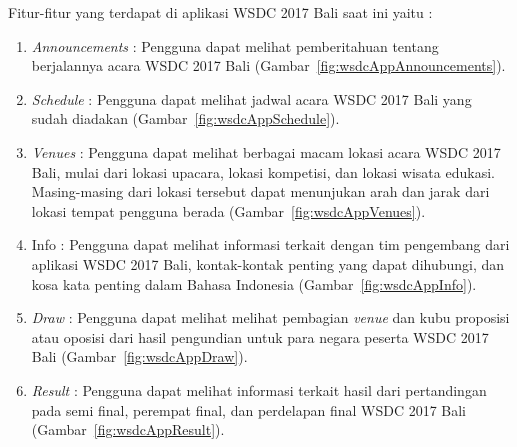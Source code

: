 Fitur-fitur yang terdapat di aplikasi WSDC 2017 Bali saat ini yaitu :

\begin{enumerate}
	\item {\it Announcements} : Pengguna dapat melihat pemberitahuan tentang berjalannya acara WSDC 2017 Bali (Gambar~\ref{fig:wsdcAppAnnouncements}).

	\item {\it Schedule} : Pengguna dapat melihat jadwal acara WSDC 2017 Bali yang sudah diadakan (Gambar~\ref{fig:wsdcAppSchedule}).

	\item {\it Venues} : Pengguna dapat melihat berbagai macam lokasi acara WSDC 2017 Bali, mulai dari lokasi upacara, lokasi kompetisi, dan lokasi wisata edukasi. Masing-masing dari lokasi tersebut dapat menunjukan arah dan jarak dari lokasi tempat pengguna berada (Gambar~\ref{fig:wsdcAppVenues}).

	\item Info : Pengguna dapat melihat informasi terkait dengan tim pengembang dari aplikasi WSDC 2017 Bali, kontak-kontak penting yang dapat dihubungi, dan kosa kata penting dalam Bahasa Indonesia (Gambar~\ref{fig:wsdcAppInfo}).

	\item {\it Draw} : Pengguna dapat melihat melihat pembagian {\it venue} dan kubu proposisi atau oposisi dari hasil pengundian untuk para negara peserta WSDC 2017 Bali (Gambar~\ref{fig:wsdcAppDraw}).

	\item {\it Result} : Pengguna dapat melihat informasi terkait hasil dari pertandingan pada semi final, perempat final, dan perdelapan final WSDC 2017 Bali (Gambar~\ref{fig:wsdcAppResult}).
\end{enumerate}

